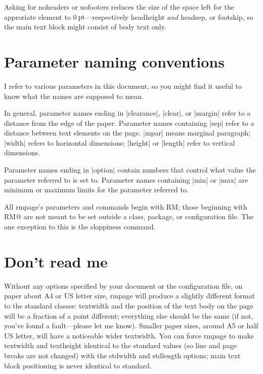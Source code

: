 \documentclass[11pt,loose,twoside,touchwider,longish,
                      noheaders,a4paper,notstdmargins]{report}
\makeatletter
\newcommand*{\unit}[1]{\ifmmode\@unit{\hbox{#1}}\else$\@unit{\hbox{#1}}$\fi}%
\let\units=\unit
\def\@unit#1{{\setbox0=\hbox{#1}\ifdim\wd0<1.125em\,\else\>\fi\box0}}
\DeclareRobustCommand*{\comname}[1]{{\ttfamily\makeatletter\bs #1\makeatother}}
\newcommand*{\classname}[1]{{\ttfamily #1}}
\newcommand*{\optname}[1]{{\ttfamily #1}}
\newcommand*{\rmpage}{\classname{rmpage}\xspace}
\makeatother
\begin{document}
Asking for \optname{noheaders} or \optname{nofooters} reduces the size
of the space left for the approriate element to
0\units{pt}---respectively \comname{headheight} \emph{and}
\comname{headsep}, or \comname{footskip}, so the main text block might
consist of body text only.

\section{Parameter naming conventions}

I refer to various parameters in this document, so you might find it
useful to know what the names are supposed to mean.

In general, parameter names ending in |clearance|, |clear|, or
|margin| refer to a distance from the edge of the paper.  Parameter
names containing |sep| refer to a distance between text elements on
the page.  |mpar| means marginal paragraph; |width| refers to
horizontal dimensions; |height| or |length| refer to vertical
dimensions.

Parameter names ending in |option| contain numbers that control what
value the parameter referred to is set to.  Parameter names containing
|min| or |max| are minimum or maximum limits for the parameter
referred to.

All \rmpage's parameters and commands begin with \comname{RM}; those
beginning with \comname{RM@} are not meant to be set outside a class,
package, or configuration file.  The one exception to this is the
\comname{sloppiness} command.


\section{Don't read me}

Without any options specified by your document or the configuration
file, on paper about A4 or US letter size, \rmpage will produce a
slightly different format to the standard classes: \comname{textwidth}
and the position of the text body on the page will be a fraction of a
point different; everything else should be the same (if not, you've
found a fault---please let me know).  Smaller paper sizes, around A5
or half US letter, will have a noticeable wider \comname{textwidth}.
You can force \rmpage to make \comname{textwidth} and
\comname{textheight} identical to the standard values (so line and
page breaks are not changed) with the \optname{stdwidth} and
\optname{stdlength} options; main text block positioning is never
identical to standard.
\end{document}
